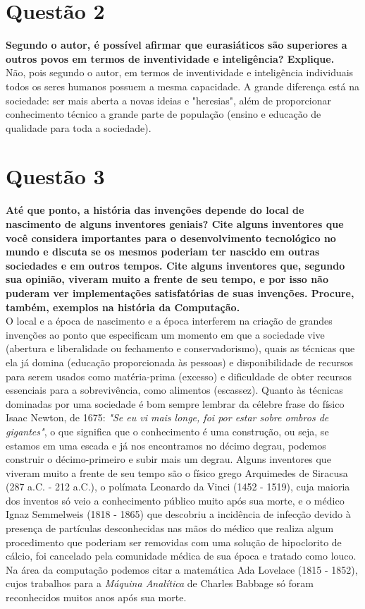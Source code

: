 \section{Questão 2}
\label{sec:q2}
\textbf{Segundo o autor, é possível afirmar que eurasiáticos são superiores a outros povos em termos de inventividade e inteligência? Explique.} \\

Não, pois segundo o autor, em termos de inventividade e inteligência individuais todos os seres humanos possuem a mesma capacidade. A grande diferença está na sociedade: ser mais aberta a novas ideias e "heresias", além de proporcionar conhecimento técnico a grande parte de população (ensino e educação de qualidade para toda a sociedade).


\section{Questão 3}
\label{sec:q3}
\textbf{Até que ponto, a história das invenções depende do local de nascimento de alguns inventores geniais? Cite alguns inventores que você considera importantes para o desenvolvimento tecnológico no mundo e discuta se os mesmos poderiam ter nascido em outras sociedades e em outros tempos. Cite alguns inventores que, segundo sua opinião, viveram muito a frente de seu tempo, e por isso não puderam ver implementações satisfatórias de suas invenções. Procure, também, exemplos na história da Computação.} \\

O local e a época de nascimento e a época interferem na criação de grandes invenções ao ponto que especificam um momento em que a sociedade vive (abertura e liberalidade ou fechamento e conservadorismo), quais as técnicas que ela já domina (educação proporcionada às pessoas) e disponibilidade de recursos para serem usados como matéria-prima (excesso) e dificuldade de obter recursos essenciais para a sobrevivência, como alimentos (escassez). Quanto às técnicas dominadas por uma sociedade é bom sempre lembrar da célebre frase do físico Isaac Newton, de 1675: \textit{"Se eu vi mais longe, foi por estar sobre ombros de gigantes"}, o que significa que o conhecimento é uma construção, ou seja, se estamos em uma escada e já nos encontramos no décimo degrau, podemos construir o décimo-primeiro e subir mais um degrau. Alguns inventores que viveram muito a frente de seu tempo são o físico grego Arquimedes de Siracusa (287 a.C. - 212 a.C.), o polímata Leonardo da Vinci (1452 - 1519), cuja maioria dos inventos só veio a conhecimento público muito após sua morte, e o médico Ignaz Semmelweis (1818 - 1865) que descobriu a incidência de infecção devido à presença de partículas desconhecidas nas mãos do médico que realiza algum procedimento que poderiam ser removidas com uma solução de hipoclorito de cálcio, foi cancelado pela comunidade médica de sua época e tratado como louco. Na área da computação podemos citar a matemática Ada Lovelace (1815 - 1852), cujos trabalhos para a \textit{Máquina Analítica} de Charles Babbage só foram reconhecidos muitos anos após sua morte.

